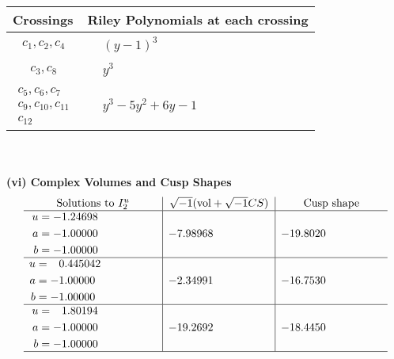 \documentclass[1p]{elsarticle_modified}
\theoremstyle{definition}
\newcommand{\I}{\sqrt{-1}}
\begin{document}
\begin{tabular}{m{50pt}|m{274pt}}
Crossings & \hspace{64pt}Riley Polynomials at each crossing \\
\hline $$\begin{aligned}c_{1},c_{2},c_{4}\end{aligned}$$&$\begin{aligned}
&(y-1)^3
\end{aligned}$\\
\hline $$\begin{aligned}c_{3},c_{8}\end{aligned}$$&$\begin{aligned}
&y^3
\end{aligned}$\\
\hline $$\begin{aligned}c_{5},c_{6},c_{7}\\c_{9},c_{10},c_{11}\\c_{12}\end{aligned}$$&$\begin{aligned}
&y^3-5 y^2+6 y-1
\end{aligned}$\\
\hline
\end{tabular}\\~\\
\newpage\flushleft \textbf{(vi) Complex Volumes and Cusp Shapes}
$$\begin{array}{c|c|c}  
\text{Solutions to }I^u_{2}& \I (\text{vol} + \sqrt{-1}CS) & \text{Cusp shape}\\
 \hline 
\begin{aligned}
u &= -1.24698\phantom{ +0.000000I} \\
a &= -1.00000\phantom{ +0.000000I} \\
b &= -1.00000\phantom{ +0.000000I}\end{aligned}
 & -7.98968\phantom{ +0.000000I} & -19.8020\phantom{ +0.000000I} \\ \hline\begin{aligned}
u &= \phantom{-}0.445042\phantom{ +0.000000I} \\
a &= -1.00000\phantom{ +0.000000I} \\
b &= -1.00000\phantom{ +0.000000I}\end{aligned}
 & -2.34991\phantom{ +0.000000I} & -16.7530\phantom{ +0.000000I} \\ \hline\begin{aligned}
u &= \phantom{-}1.80194\phantom{ +0.000000I} \\
a &= -1.00000\phantom{ +0.000000I} \\
b &= -1.00000\phantom{ +0.000000I}\end{aligned}
 & -19.2692\phantom{ +0.000000I} & -18.4450\phantom{ +0.000000I}\\
 \hline 
 \end{array}$$\newpage
\end{document}
